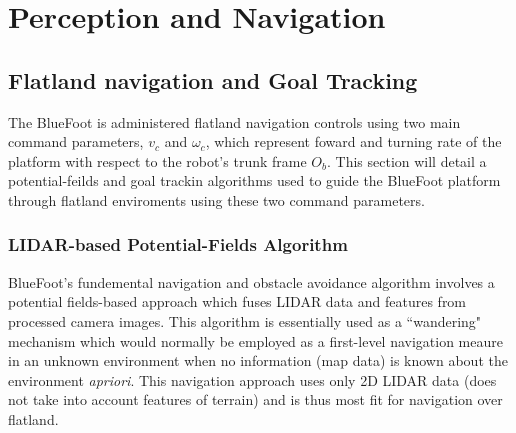 \chapter{Perception and Navigation}
\label{ch::navigation}


	\section{Flatland navigation and Goal Tracking}
	
		The BlueFoot is administered flatland navigation controls using two main command parameters, $v_{c}$ and $\omega_{c}$, which represent foward and turning rate of the platform with respect to the robot's trunk frame $O_{b}$. This section will detail a potential-feilds and goal trackin algorithms used to guide the BlueFoot platform through flatland enviroments using these two command parameters.

		\subsection{LIDAR-based Potential-Fields Algorithm}
		BlueFoot's fundemental navigation and obstacle avoidance algorithm involves a potential fields-based approach which fuses LIDAR data and features from processed camera images. This algorithm is essentially used as a ``wandering" mechanism which would normally be employed as a first-level navigation meaure in an unknown environment when no information (\EG map data) is known about the environment \emph{apriori}. This navigation approach uses only 2D LIDAR data (does not take into account features of terrain) and is thus most fit for navigation over flatland.

